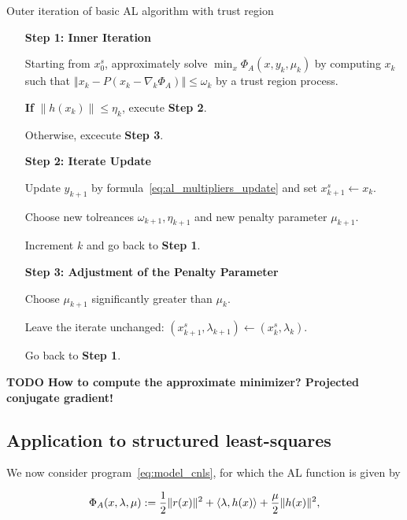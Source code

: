 \documentclass[10pt]{article}
\numberwithin{equation}{section}
\begin{document}
	 	\begin{algorithm}
	 	\caption{Outer iteration of basic AL algorithm with trust region}\label{algo:outer_basic_al_trm}
	 		\begin{enumerate}
	 		\item[\textbf{Step 1: Inner Iteration}]
	 		
	 		Starting from $x_0^s$, approximately solve $\min_x \Phi_A(x,y_k,\mu_k)$ by computing $x_k$ such that \(\left\Vert x_k - P(x_k-\nabla_k\Phi_A)\right\Vert \le \omega_k\)
	 		by a trust region process.
	 		
	 		\textbf{If} $\|h(x_k)\| \le \eta_k$, execute \textbf{Step 2}.
	 		
	 		Otherwise, excecute \textbf{Step 3}.
	 		
	 		\item[\textbf{Step 2: Iterate Update}]
	 		
	 		Update $y_{k+1}$ by formula~\eqref{eq:al_multipliers_update} and set $x_{k+1}^s \gets x_k $.
	 		
	 		Choose new tolreances \(\omega_{k+1}, \eta_{k+1}\) and new penalty parameter \(\mu_{k+1}\).
	 		
	 		Increment $k$ and go back to \textbf{Step 1}.
	 		
	 		\item[\textbf{Step 3: Adjustment of the Penalty Parameter}] 
	 		
	 		Choose $\mu_{k+1}$ significantly greater than $\mu_k$.
	 		
	 		Leave the iterate unchanged: \(\left(x_{k+1}^s,\lambda_{k+1}\right) \gets \left(x_k^s,\lambda_k\right)\).
	 		
	 		Go back to \textbf{Step 1}.
	 	\end{enumerate}
	 \end{algorithm}
	 
	 \textbf{TODO How to compute the approximate minimizer? Projected conjugate gradient!}
	 \subsection{Application to structured least-squares}
	 
	 We now consider program~\eqref{eq:model_cnls}, for which the AL function is given by
	 
	 \begin{equation}
	 	\label{eq:lsal}
	 	\Phi_A(x,\lambda,\mu) := \dfrac{1}{2}\|r(x)\|^2 + \left\langle {\lambda} , {h(x)} \right\rangle + \dfrac{\mu}{2} \|h(x)\|^2,
	 \end{equation}
	 
\end{document}
